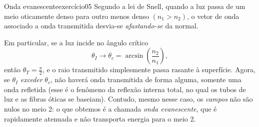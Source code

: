 \begin{exercício}{Onda evanescente}{exercício05}
    Segundo a lei de Snell, quando a luz passa de um meio oticamente denso para outro menos denso \((n_1 > n_2)\), o vetor de onda associado a onda transmitida desvia-se \emph{afastando-se} da normal.
    \begin{center}
    \end{center}
    Em particular, se a luz incide no ângulo crítico
    \begin{equation*}
        \theta_I \to \theta_c = \arcsin\left(\frac{n_2}{n_1}\right),
    \end{equation*}
    então \(\theta_T = \frac{\pi}{2}\), e o raio transmitido simplesmente passa rasante à superfície. Agora, se \(\theta_I\) \emph{exceder} \(\theta_c\), não haverá onda transmitida de forma alguma, somente uma onda refletida (esse é o fenômeno da reflexão interna total, no qual os tubos de luz e as fibras óticas se baseiam). Contudo, mesmo nesse caso, os \emph{campos} não são nulos no meio 2: o que obtemos é a chamada \emph{onda evanescente}, que é rapidamente atenuada e não transporta energia para o meio 2.


\end{exercício}
